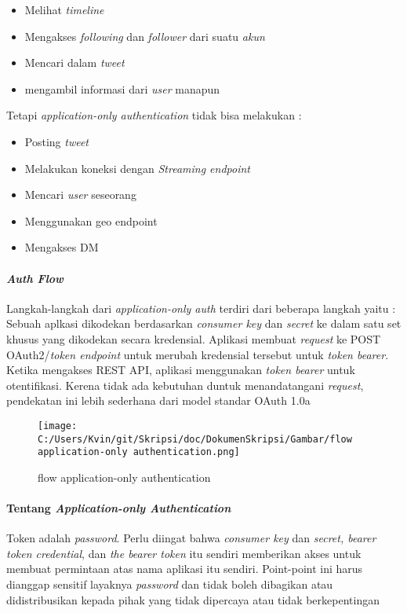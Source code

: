 \begin{itemize}
	\item Melihat \textit{timeline}
	\item Mengakses \textit{following} dan \textit{follower} dari suatu \textit{akun}
	\item Mencari dalam \textit{tweet}
	\item mengambil informasi dari \textit{user} manapun
\end{itemize}


Tetapi \textit{application-only authentication} tidak bisa melakukan :

\begin{itemize}
	\item Posting \textit{tweet}
	\item Melakukan koneksi dengan \textit{Streaming endpoint}
	\item Mencari \textit{user} seseorang
	\item Menggunakan geo endpoint
	\item Mengakses DM
\end{itemize}

\paragraph{\textit{Auth Flow}}
Langkah-langkah dari \textit{application-only auth} terdiri dari beberapa langkah yaitu :
Sebuah aplkasi dikodekan berdasarkan \textit{consumer key} dan \textit{secret} ke dalam satu set khusus yang dikodekan secara kredensial.
Aplikasi membuat \textit{request} ke POST OAuth2/\textit{token endpoint} untuk merubah kredensial tersebut untuk \textit{token bearer}.
Ketika mengakses REST API, aplikasi menggunakan \textit{token bearer} untuk otentifikasi.
Kerena tidak ada kebutuhan duntuk menandatangani \textit{request}, pendekatan ini lebih sederhana dari model standar OAuth 1.0a

\begin{figure}
	\centering
		\texttt{[image: C:/Users/Kvin/git/Skripsi/doc/DokumenSkripsi/Gambar/flow application-only authentication.png]}
	\caption{flow application-only authentication}
	\label{fig:flow application-only authentication}
\end{figure}


\paragraph{Tentang \textit{Application-only Authentication}}
Token adalah \textit{password}. Perlu diingat bahwa \textit{consumer key} dan \textit{secret, bearer token credential}, dan \textit{the bearer token} itu sendiri memberikan akses untuk membuat permintaan atas nama aplikasi itu sendiri. Point-point ini harus dianggap sensitif layaknya \textit{password} dan tidak boleh dibagikan atau didistribusikan kepada pihak yang tidak dipercaya atau tidak berkepentingan


